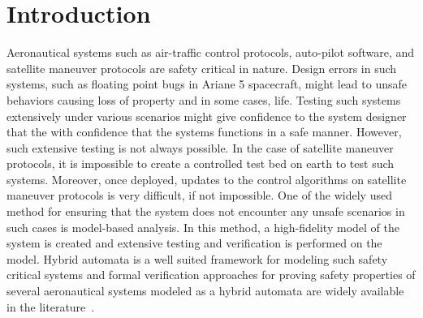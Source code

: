 \section{Introduction}
\label{sec:intro}

Aeronautical systems such as air-traffic control protocols, auto-pilot software, and satellite maneuver protocols are safety critical in nature.
%
Design errors in such systems, such as floating point bugs in Ariane 5 spacecraft, might lead to unsafe behaviors causing loss of property and in some cases, life.
%
Testing such systems extensively under various scenarios might give confidence to the system designer that the  with confidence that the systems functions in a safe manner.
%
However, such extensive testing is not always possible. 
%
%
In the case of satellite maneuver protocols, it is impossible to create a controlled test bed on earth to test such systems.
%
Moreover, once deployed, updates to the control algorithms on satellite maneuver protocols is very difficult, if not impossible.
%
%
One of the widely used method for ensuring that the system does not encounter any unsafe scenarios in such cases is model-based analysis.
%
In this method, a high-fidelity model of the system is created and extensive testing and verification is performed on the model.
%
%
% 
% 
Hybrid automata is a well suited framework for modeling such safety critical systems and formal verification approaches for proving safety properties of several aeronautical systems modeled as a hybrid automata are widely available in the literature~\cite{tomlin1998conflict,pallottino2002conflict,prabhakar2009verifying,johnson2012satellite,munoz2013tcas,zhao2014formal,duggirala2014temporal,jeannin2015formally}.
%
%
%
%

